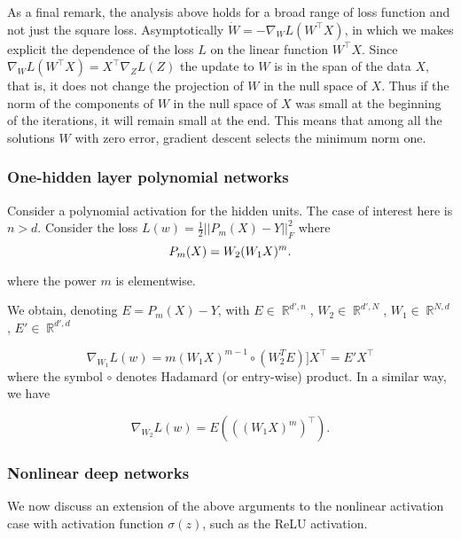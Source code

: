 \documentclass[10pt]{article}
\DeclareMathOperator{\R}{\mathbb{R}}
\begin{document}
As a final remark, the analysis above holds for a broad range of loss
function and not just the square loss.  Asymptotically
$\dot{W} = - \nabla_{W} L(W^\top X) $, in which we makes explicit the
dependence of the loss $L$ on the linear function $W^\top X$. Since
$\nabla_{W} L(W^\top X) = X^\top \nabla_{Z} L(Z)$ the update to $W$ is
in the span of the data $X$, that is, it does not change the
projection of $W$ in the null space of $X$. Thus if the norm of the
components of $W$ in the null space of $X$ was small at the beginning
of the iterations, it will remain small at the end. This means that
among all the solutions $W$ with zero error, gradient descent selects
the minimum norm one.

\subsubsection{One-hidden layer polynomial networks}
\label{PolActiv}

Consider a polynomial activation for the hidden units. The case of
interest here is $ n > d$. Consider the loss
$L(w)=\frac{1}{2}||P_m(X)-Y||^2_F$ where
\begin{equation}
P_m(X) =W_2(W_{1}X)^{\tiny m}.
\label{PolyDeep}
\end{equation}

\noindent where the power $m$ is elementwise.

We obtain, denoting $E = P_m(X)-Y$, with $E \in \R^{d',n}$, $W_2 \in
\R^{d',N}$, $W_1 \in \R^{N,d}$, $E' \in \R^{d', d}$

\begin{equation}
\nabla_{W_1} L(w)=m (W_{1}X)^{m-1}\circ (W_{2}^TE)]
X^\top= E' X^\top
\label{PolyDeep2}
\end{equation}
\noindent where the symbol $\circ$ denotes Hadamard (or entry-wise) product. In
a similar way, we have 

\begin{equation}
\nabla_{W_2} L(w)=E (((W_{1}X)^{m})^\top ).
\label{PolyDeep3}
\end{equation}



\subsubsection{Nonlinear deep networks} 
\label{sec:app_nonlinear_nets}
We now
discuss an extension of the above arguments to the nonlinear
activation case with activation function $\sigma(z)$, such as the ReLU activation.
\end{document}
